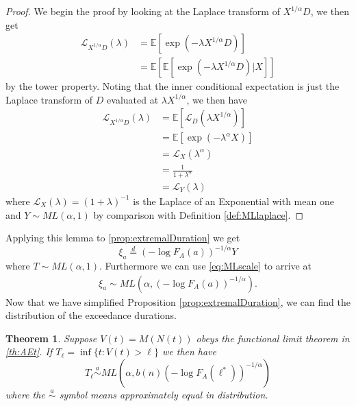 \documentclass[honours,12pt]{unswthesis}
\newcommand{\E}{\mathbb{E}}
\newcommand{\1}{\mathbf 1}
\newtheorem{theorem}[equation]{Theorem}
\numberwithin{equation}{section}
\theoremstyle{definition}
\theoremstyle{remark}
\begin{document}
\begin{proof}
We begin the proof by looking at the Laplace transform of $X^{1/\alpha}D$, we then get
\begin{align*}
\mathcal{L}_{X^{1/\alpha}D}(\lambda)&=\E[\exp(-\lambda X^{1/\alpha}D)]\\
									 &=\E[\E[\exp(-\lambda X^{1/\alpha}D)|X]]
\end{align*}
by the tower property. Noting that the inner conditional expectation is just the Laplace transform of $D$ evaluated at $\lambda X^{1/\alpha}$, we then have
\begin{align*}
\mathcal{L}_{X^{1/\alpha}D}(\lambda)&=\E[\mathcal{L}_D(\lambda X^{1/\alpha})]\\
									 &=\E[\exp(-\lambda^\alpha X)]\\
									 &=\mathcal{L}_X(\lambda^\alpha)\\
									 &=\frac{1}{1+\lambda^\alpha}\\
									 &=\mathcal{L}_Y(\lambda)
\end{align*}
where $\mathcal{L}_X(\lambda)=(1+\lambda)^{-1}$ is the Laplace of an Exponential with mean one and $Y\sim ML(\alpha,1)$ by comparison with Definition \ref{def:MLlaplace}.
\end{proof}
\noindent Applying this lemma to \ref{prop:extremalDuration} we get
\[
	\xi_a \overset{d}{=} (-\log F_A(a))^{-1/\alpha}Y
\]
where $T\sim ML(\alpha,1)$. Furthermore we can use \ref{eq:MLscale} to arrive at
\begin{align}\label{eq:extremalDurationFinal}
 	\xi_a \sim ML\left(\alpha,(-\log F_A(a))^{-1/\alpha}\right).
\end{align}
Now that we have simplified Proposition \ref{prop:extremalDuration}, we can find the distribution of the exceedance durations.
\begin{theorem}
	Suppose $V(t)=M(N(t))$ obeys the functional limit theorem in \ref{th:AEt}. If  $T_\ell=\inf\{t: V(t) > \ell\}$ we then have
	\[
		T_\ell\overset{a}{\sim}ML\left(\alpha, b(n)(-\log F_A(\ell^*))^{-1/\alpha}\right)
	\]
	where the $\overset{a}{\sim}$ symbol means approximately equal in distribution.
\end{theorem}
\end{document}
